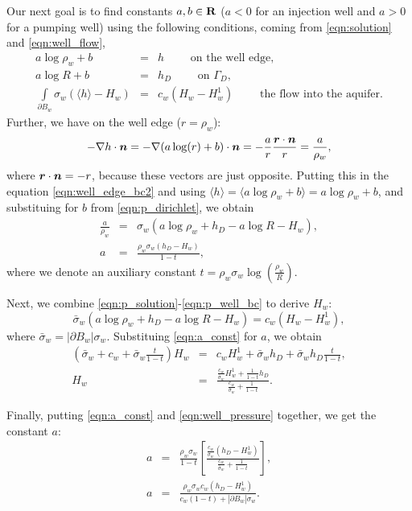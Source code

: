 Our next goal is to find constants $a,b\in\mathbf{R}$ ($a<0$ for an injection well and $a>0$ for a pumping well) 
using the following conditions, coming from \eqref{eqn:solution} and \eqref{eqn:well_flow},
\begin{eqnarray}
  a\log \rho_w + b &=& h  \qquad \textrm{ on the well edge,} \label{eqn:p_solution}\\
  a\log R + b &=& h_D  \qquad \textrm{ on } \Gamma_D, \label{eqn:p_dirichlet}\\
  \int \limits_{\partial B_w} \sigma_w\left(\langle h\rangle - H_w\right) &=& c_w(H_w - H^1_w) \qquad \textrm{ the flow into the aquifer.} \label{eqn:p_well_bc}
\end{eqnarray}
Further, we have on the well edge ($r=\rho_w$):
\begin{multline}
-\nabla h \cdot \mathbf{\boldsymbol{n}} = -\nabla (a\log(r) + b) \cdot \mathbf{\boldsymbol{n}} = - \frac{a}{r}\frac{\mathbf{\boldsymbol{r}}\cdot\mathbf{\boldsymbol{n}}}{r} = \frac{a}{\rho_w},
\end{multline}
where $\mathbf{\boldsymbol{r}}\cdot\mathbf{\boldsymbol{n}}=-r$, because these vectors are just opposite. Putting this in the equation
\eqref{eqn:well_edge_bc2} and using $\langle h \rangle=\langle a\log \rho_w + b \rangle = a\log \rho_w + b$,
and substituing for $b$ from \eqref{eqn:p_dirichlet}, we obtain
\begin{eqnarray}
  \frac{a}{\rho_w} &=& \sigma_w\left( a\log \rho_w + h_D -a\log R - H_w \right), \nonumber\\
  a &=& \frac{\rho_w\sigma_w(h_D-H_w)}{1-t},  \label{eqn:a_const}
\end{eqnarray}
where we denote an auxiliary constant $t=\rho_w\sigma_w\log\left(\frac{\rho_w}{R}\right)$.

Next, we combine \eqref{eqn:p_solution}-\eqref{eqn:p_well_bc} to derive $H_w$:
\begin{equation}
  \bar{\sigma}_w\left( a\log \rho_w + h_D -a\log R - H_w \right) = c_w(H_w-H^1_w), \nonumber
\end{equation}
where $\bar{\sigma}_w=|\partial B_w|\sigma_w$. Substituing \eqref{eqn:a_const} for $a$, we obtain
\begin{eqnarray}
  \left(\bar{\sigma}_w + c_w + \bar{\sigma}_w\frac{t}{1-t}\right)H_w &=& c_w H^1_w + \bar{\sigma}_w h_D + \bar{\sigma}_w h_D\frac{t}{1-t}, \nonumber\\
  H_w &=& \frac{\frac{c_w}{\bar{\sigma}_w}H^1_w + \frac{1}{1-t}h_D}{\frac{c_w}{\bar{\sigma}_w} + \frac{1}{1-t}}. \label{eqn:well_pressure}
\end{eqnarray}

Finally, putting \eqref{eqn:a_const} and \eqref{eqn:well_pressure} together, we get the constant $a$:
\begin{eqnarray}
  a &=& \frac{\rho_w\sigma_w}{1-t}\left[ \frac{\frac{c_w}{\bar{\sigma}_w}(h_D-H^1_w)}{\frac{c_w}{\bar{\sigma}_w}+\frac{1}{1-t}} \right], \nonumber\\
  a &=& \frac{\rho_w\sigma_w c_w (h_D-H^1_w)}{c_w(1-t) + |\partial B_w|\sigma_w}. \label{eqn:a_final}
\end{eqnarray}



